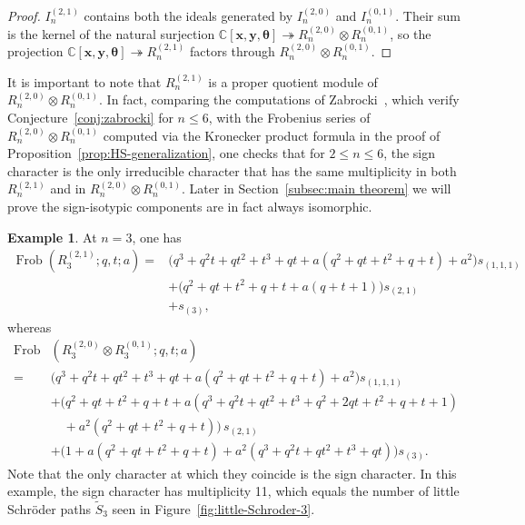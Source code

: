 \documentclass[11pt, noadjust, reqno]{amsart}
\theoremstyle{definition}
\newtheorem{example}[theorem]{Example}
\theoremstyle{remark}
\numberwithin{equation}{section}
\newcommand{\0}{\emptyset}
\newcommand{\C}{\mathbb{C}}
\DeclareMathOperator{\Frob}{Frob}
\begin{document}
\begin{proof}
    $I_n^{(2,1)}$ contains both the ideals generated by $I_n^{(2,0)}$ and $I_n^{(0,1)}$. 
    Their sum is the kernel of the natural surjection $\C[\bm x,\bm y,\bm\theta] \twoheadrightarrow R_n^{(2,0)}\otimes R_n^{(0,1)}$, so the projection $\C[\bm x,\bm y,\bm\theta]\twoheadrightarrow R_n^{(2,1)}$ factors through $R_n^{(2,0)}\otimes R_n^{(0,1)}$.
\end{proof}

It is important to note that $R_n^{(2,1)}$ is a proper quotient module of $R_n^{(2,0)} \otimes R_n^{(0,1)}$. 
In fact, comparing the computations of Zabrocki~\cite{Zabrocki2019}, which verify Conjecture~\ref{conj:zabrocki} for $n \leq 6$, with the Frobenius series of $R_n^{(2,0)} \otimes R_n^{(0,1)}$ computed via the Kronecker product formula in the proof of
Proposition~\ref{prop:HS-generalization}, one checks that for $2 \leq n \leq 6$, the sign character is the only irreducible character that has the same multiplicity in both $R_n^{(2,1)}$ and in $R_n^{(2,0)} \otimes R_n^{(0,1)}$.
Later in Section~\ref{subsec:main theorem} we will prove the sign-isotypic components are in fact always isomorphic. 

\begin{example}\label{ex:sign-tensor}
At $n=3$, one has 
\begin{align*}
    \Frob(R_3^{(2,1)}; q,t;a) = {}&\big(q^3+q^2t+qt^2+t^3+qt+ a(q^2+qt+t^2+q+t) +a^2\big)s_{(1,1,1)}\\ 
    &+ \big(q^2+qt+t^2+q+t + a(q+t+1)\big)s_{(2,1)}\\ 
    &+ s_{(3)},
\end{align*}
whereas
\begin{align*}
    \Frob&(R_3^{(2,0)} \otimes R_3^{(0,1)}; q,t;a) \\
    = {}&\big(q^3+q^2t+qt^2+t^3+qt+ a(q^2+qt+t^2+q+t) +a^2\big)s_{(1,1,1)}\\
    & + \big(q^2+qt+t^2+q+t +  a(q^3+q^2t+qt^2+t^3+q^2+2qt+t^2+q+t+1)\\ 
    & \quad{}+ a^2(q^2+qt+t^2+q+t)\big)\,s_{(2,1)}\\
    &+ \big(1 + a(q^2+qt+t^2+q+t) + a^2 (q^3+q^2t+qt^2+t^3+qt) \big) s_{(3)}.
\end{align*}
Note that the only character at which they coincide is the sign character. 
In this example, the sign character has multiplicity 11, which equals the number of little Schr\"oder paths $\widetilde{S}_3$ seen in Figure~\ref{fig:little-Schroder-3}.
\end{example}
\end{document}
